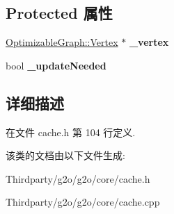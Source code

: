 \subsection*{Protected 属性}
\begin{DoxyCompactItemize}
\item 
\hypertarget{classg2o_1_1CacheContainer_a899b5f4d01859463cedf663b68f78391}{\hyperlink{classg2o_1_1OptimizableGraph_1_1Vertex}{Optimizable\-Graph\-::\-Vertex} $\ast$ {\bfseries \-\_\-vertex}}\label{classg2o_1_1CacheContainer_a899b5f4d01859463cedf663b68f78391}

\item 
\hypertarget{classg2o_1_1CacheContainer_a5fd5257863e41c3fc38336aaa7779b3e}{bool {\bfseries \-\_\-update\-Needed}}\label{classg2o_1_1CacheContainer_a5fd5257863e41c3fc38336aaa7779b3e}

\end{DoxyCompactItemize}


\subsection{详细描述}


在文件 cache.\-h 第 104 行定义.



该类的文档由以下文件生成\-:\begin{DoxyCompactItemize}
\item 
Thirdparty/g2o/g2o/core/cache.\-h\item 
Thirdparty/g2o/g2o/core/cache.\-cpp\end{DoxyCompactItemize}
